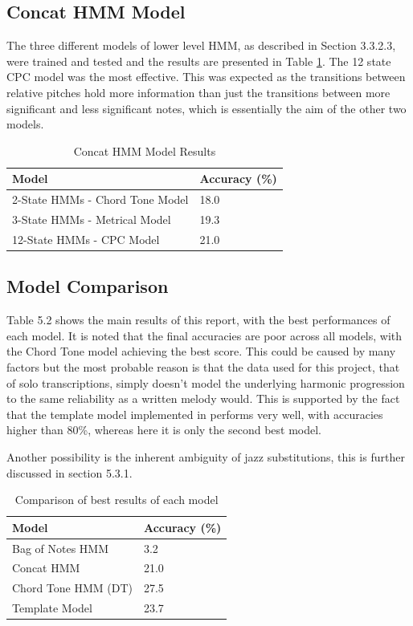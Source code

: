 \documentclass[bsc,singlespacing,parskip,deptreport,twoside,frontabs]{infthesis}
\begin{document}
\subsection{Concat HMM Model}

The three different models of lower level HMM, as described in Section 3.3.2.3, were trained and tested and the results are presented in Table \ref{concat}. The 12 state CPC model was the most effective. This was expected as the transitions between relative pitches hold more information than just the transitions between more significant and less significant notes, which is essentially the aim of the other two models.

\begin{table}
\centering
\caption{Concat HMM Model Results}
\label{concat}
\begin{tabular}{l|l}
Model                           & Accuracy (\%) \\ \hline
2-State HMMs - Chord Tone Model & 18.0          \\
3-State HMMs - Metrical Model   & 19.3          \\
12-State HMMs - CPC Model       & 21.0         
\end{tabular}
\end{table}

\subsection{Model Comparison}

Table 5.2 shows the main results of this report, with the best performances of each model. It is noted that the final accuracies are poor across all models, with the Chord Tone model achieving the best score. This could be caused by many factors but the most probable reason is that the data used for this project, that of solo transcriptions, simply doesn't model the underlying harmonic progression to the same reliability as a written melody would. This is supported by the fact that the template model implemented in \cite{pardo2002algorithms} performs very well, with accuracies higher than 80\%, whereas here it is only the second best model.

Another possibility is the inherent ambiguity of jazz substitutions, this is further discussed in section 5.3.1.

\begin{table}
\centering
\caption{Comparison of best results of each model}
\label{main}
\begin{tabular}{l|l}
Model               & Accuracy (\%) \\ \hline
Bag of Notes HMM    & 3.2           \\
Concat HMM          & 21.0          \\
Chord Tone HMM (DT) & 27.5          \\
Template Model      & 23.7         
\end{tabular}
\end{table}
\end{document}
